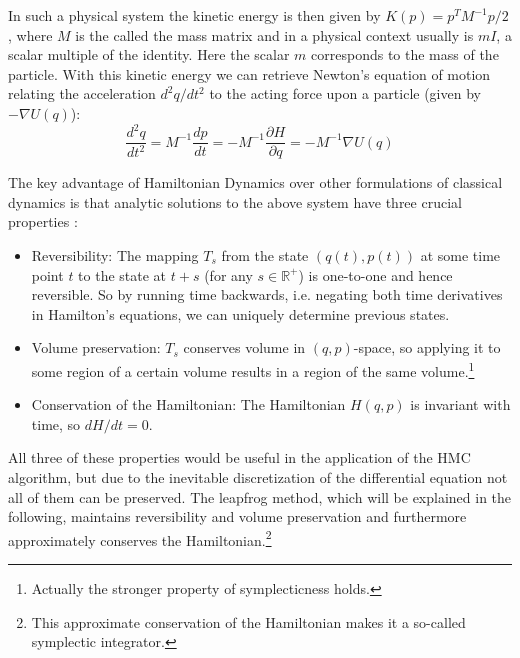 In such a physical system the kinetic energy is then given by $K(p) = p^T M^{-1} p /2$, where $M$ is the called the mass matrix and in a physical context usually is $m I$, a scalar multiple of the identity. Here the scalar $m$ corresponds to the mass of the particle. With this kinetic energy we can retrieve Newton's equation of motion relating the acceleration $d^2q/dt^2$ to the acting force upon a particle (given by $-\nabla U(q)$):
\begin{equation} \label{eq:NewtonsEquation}
\frac{d^2q}{dt^2} = M^{-1} \frac{dp}{dt} = - M^{-1} \frac{\partial H}{\partial q} = - M^{-1} \nabla U(q)
\end{equation}

The key advantage of Hamiltonian Dynamics over other formulations of classical dynamics is that analytic solutions to the above system have three crucial properties \parencite{Neal2011}:
\begin{itemize}
\item Reversibility: The mapping $T_s$ from the state $(q(t), p(t))$ at some time point $t$ to the state at $t+s$ (for any $s \in \mathbb{R^+}$) is one-to-one and hence reversible. So by running time backwards, i.e. negating both time derivatives in Hamilton's equations, we can uniquely determine previous states.
\item Volume preservation: $T_s$ conserves volume in $(q, p)$-space, so applying it to some region of a certain volume results in a region of the same volume.\footnote{Actually the stronger property of symplecticness holds.}
\item Conservation of the Hamiltonian: The Hamiltonian $H(q, p)$ is invariant with time, so $dH/dt = 0$.
\end{itemize}

All three of these properties would be useful in the application of the HMC algorithm, but due to the inevitable discretization of the differential equation not all of them can be preserved. The leapfrog method, which will be explained in the following, maintains reversibility and volume preservation and furthermore approximately conserves the Hamiltonian.\footnote{This approximate conservation of the Hamiltonian makes it a so-called symplectic integrator.}

